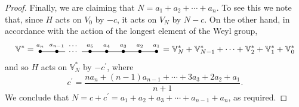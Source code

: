 \begin{proof}
Finally, we are claiming that $N=a_1+a_2+\cdots+a_n$. To see this we note that,
since $H$ acts on $V_0$ by $-c$, it acts on $V_N$ by $N-c$. On the other hand,
in accordance with the action of the longest element of the Weyl group,
\[{\mathbb{V}}^*=\enskip\raisebox{-5pt}{\begin{picture}(140,17)
\put(0,5){\makebox(0,0){$\bullet$}}
\put(20,5){\makebox(0,0){$\bullet$}}
\put(60,5){\makebox(0,0){$\bullet$}}
\put(80,5){\makebox(0,0){$\bullet$}}
\put(100,5){\makebox(0,0){$\bullet$}}
\put(120,5){\makebox(0,0){$\bullet$}}
\put(140,5){\makebox(0,0){$\bullet$}}
\put(0,5){\line(1,0){30}}
\put(40,5){\makebox(0,0){\scriptsize$\cdots$}}
\put(50,5){\line(1,0){90}}
\put(0,12){\makebox(0,0){\scriptsize$a_n$}}
\put(20,12){\makebox(0,0){\scriptsize$a_{n-1}$}}
\put(40,12){\makebox(0,0){\scriptsize$\cdots$}}
\put(60,12){\makebox(0,0){\scriptsize$a_5$}}
\put(80,12){\makebox(0,0){\scriptsize$a_4$}}
\put(100,12){\makebox(0,0){\scriptsize$a_3$}}
\put(120,12){\makebox(0,0){\scriptsize$a_2$}}
\put(140,12){\makebox(0,0){\scriptsize$a_1$}}
\end{picture}}\enskip={\mathbb{V}}_N^*+{\mathbb{V}}_{N-1}^*+\cdots+
{\mathbb{V}}_2^*+{\mathbb{V}}_1^*+{\mathbb{V}}_0^*\]
and so $H$ acts on ${\mathbb{V}}_N^*$ by $-c^\prime$, where
\[c^\prime=\frac{na_n+(n-1)a_{n-1}+\cdots+3a_3+2a_2+a_1}{n+1}.\]
We conclude that $N=c+c^\prime=a_1+a_2+a_3+\cdots+a_{n-1}+a_n$, as required.
\end{proof}

